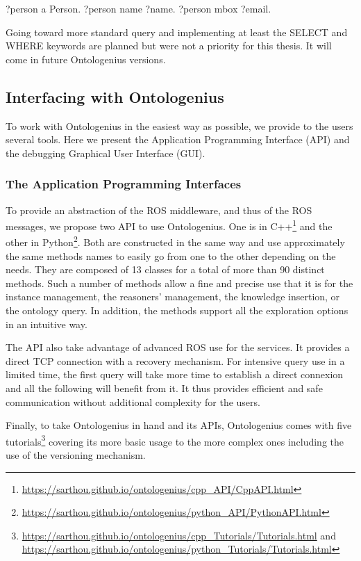\begin{verbatimtab}
?person a Person. ?person name ?name. ?person mbox ?email.
\end{verbatimtab}

Going toward more standard query and implementing at least the SELECT and WHERE keywords are planned but were not a priority for this thesis. It will come in future Ontologenius versions.

\subsection{Interfacing with Ontologenius}

To work with Ontologenius in the easiest way as possible, we provide to the users several tools. Here we present the Application Programming Interface (API) and the debugging Graphical User Interface (GUI).

\subsubsection{The Application Programming Interfaces}

To provide an abstraction of the ROS middleware, and thus of the ROS messages, we propose two API to use Ontologenius. One is in C++\footnote{\url{https://sarthou.github.io/ontologenius/cpp_API/CppAPI.html}} and the other in Python\footnote{\url{https://sarthou.github.io/ontologenius/python_API/PythonAPI.html}}. Both are constructed in the same way and use approximately the same methods names to easily go from one to the other depending on the needs. They are composed of 13 classes for a total of more than 90 distinct methods. Such a number of methods allow a fine and precise use that it is for the instance management, the reasoners' management, the knowledge insertion, or the ontology query. In addition, the methods support all the exploration options in an intuitive way.

The API also take advantage of advanced ROS use for the services. It provides a direct TCP connection with a recovery mechanism. For intensive query use in a limited time, the first query will take more time to establish a direct connexion and all the following will benefit from it. It thus provides efficient and safe communication without additional complexity for the users.

Finally, to take Ontologenius in hand and its APIs, Ontologenius comes with five tutorials\footnote{\url{https://sarthou.github.io/ontologenius/cpp_Tutorials/Tutorials.html} and \url{https://sarthou.github.io/ontologenius/python_Tutorials/Tutorials.html}} covering its more basic usage to the more complex ones including the use of the versioning mechanism.

